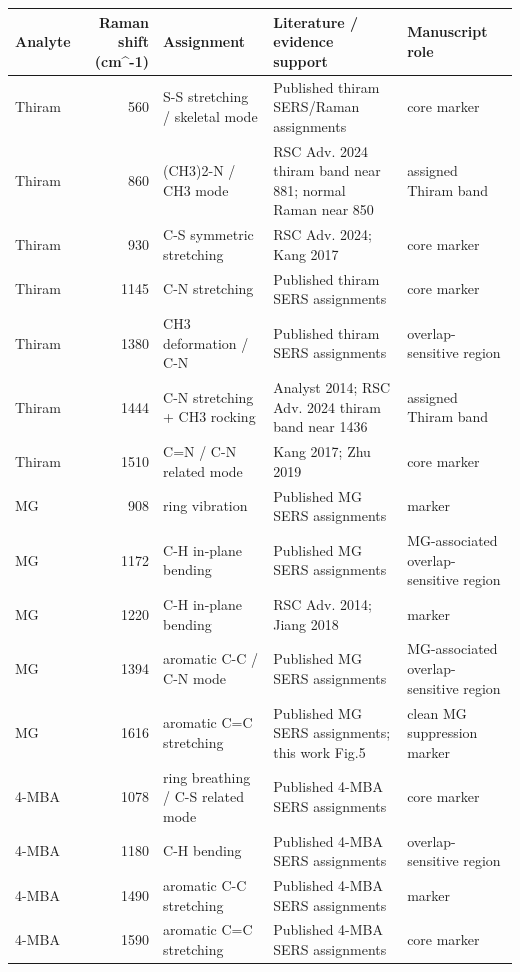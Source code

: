 \begin{tabular}{lrlll}
\toprule
Analyte & Raman shift (cm^-1) & Assignment & Literature / evidence support & Manuscript role \\
\midrule
Thiram & 560 & S-S stretching / skeletal mode & Published thiram SERS/Raman assignments & core marker \\
Thiram & 860 & (CH3)2-N / CH3 mode & RSC Adv. 2024 thiram band near 881; normal Raman near 850 & assigned Thiram band \\
Thiram & 930 & C-S symmetric stretching & RSC Adv. 2024; Kang 2017 & core marker \\
Thiram & 1145 & C-N stretching & Published thiram SERS assignments & core marker \\
Thiram & 1380 & CH3 deformation / C-N & Published thiram SERS assignments & overlap-sensitive region \\
Thiram & 1444 & C-N stretching + CH3 rocking & Analyst 2014; RSC Adv. 2024 thiram band near 1436 & assigned Thiram band \\
Thiram & 1510 & C=N / C-N related mode & Kang 2017; Zhu 2019 & core marker \\
MG & 908 & ring vibration & Published MG SERS assignments & marker \\
MG & 1172 & C-H in-plane bending & Published MG SERS assignments & MG-associated overlap-sensitive region \\
MG & 1220 & C-H in-plane bending & RSC Adv. 2014; Jiang 2018 & marker \\
MG & 1394 & aromatic C-C / C-N mode & Published MG SERS assignments & MG-associated overlap-sensitive region \\
MG & 1616 & aromatic C=C stretching & Published MG SERS assignments; this work Fig.5 & clean MG suppression marker \\
4-MBA & 1078 & ring breathing / C-S related mode & Published 4-MBA SERS assignments & core marker \\
4-MBA & 1180 & C-H bending & Published 4-MBA SERS assignments & overlap-sensitive region \\
4-MBA & 1490 & aromatic C-C stretching & Published 4-MBA SERS assignments & marker \\
4-MBA & 1590 & aromatic C=C stretching & Published 4-MBA SERS assignments & core marker \\
\bottomrule
\end{tabular}
